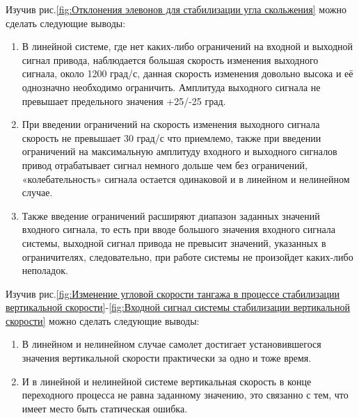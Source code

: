 Изучив рис.\ref{fig:Отклонения элевонов для стабилизации угла скольжения} можно сделать следующие выводы:
\begin{enumerate}
    \item В линейной системе, где нет каких-либо ограничений на входной и выходной сигнал привода, наблюдается большая скорость изменения выходного сигнала, около 1200 град/с, данная скорость изменения довольно высока и её однозначно необходимо ограничить. Амплитуда выходного сигнала не превышает предельного значения +25/-25 град.
    \item При введении ограничений на скорость изменения выходного сигнала скорость не превышает 30 град/с что приемлемо, также при введении ограничений на максимальную амплитуду входного и выходного сигналов привод отрабатывает сигнал немного дольше чем без ограничений, «колебательность» сигнала остается одинаковой и в линейном и нелинейном случае.
    \item Также введение ограничений расширяют диапазон заданных значений входного сигнала, то есть при вводе большого значения входного сигнала системы, выходной сигнал привода не превысит значений, указанных в ограничителях, следовательно, при работе системы не произойдет каких-либо неполадок. 
\end{enumerate}
Изучив рис.\ref{fig:Изменение угловой скорости тангажа в процессе стабилизации вертикальной скорости}-\ref{fig:Входной сигнал системы стабилизации вертикальной скорости} можно сделать следующие выводы:

\begin{enumerate}
    \item В линейном и нелинейном случае самолет достигает установившегося значения вертикальной скорости практически за одно и тоже время. 
    \item И в линейной и нелинейной системе вертикальная скорость в конце переходного процесса не равна заданному значению, это связанно с тем, что имеет место быть статическая ошибка. 
\end{enumerate}